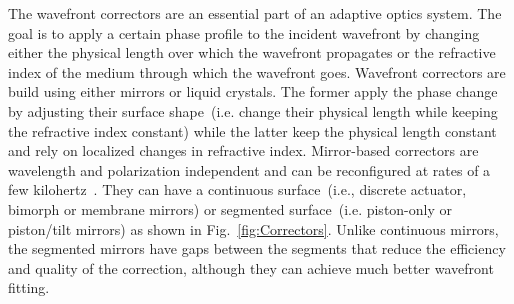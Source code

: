 The wavefront correctors are an essential part of an adaptive optics system. The goal is to apply a certain phase profile to the incident wavefront by changing either the physical length over which the wavefront propagates or the refractive index of the medium through which the wavefront goes. Wavefront correctors are build using either mirrors or liquid crystals. The former apply the phase change by adjusting their surface shape~(i.e. change their physical length while keeping the refractive index constant) while the latter keep the physical length constant and rely on localized changes in refractive index.  Mirror-based correctors are wavelength and polarization independent and can be reconfigured at rates of a few kilohertz~\cite{AOM_basic_ref}. They can have a continuous surface~(i.e., discrete actuator, bimorph or membrane mirrors) or segmented surface~(i.e. piston-only or piston/tilt mirrors) as shown in Fig.~\ref{fig:Correctors}. Unlike continuous mirrors, the segmented mirrors have gaps between the segments that reduce the efficiency and quality of the correction, although they can achieve much better wavefront fitting. 

